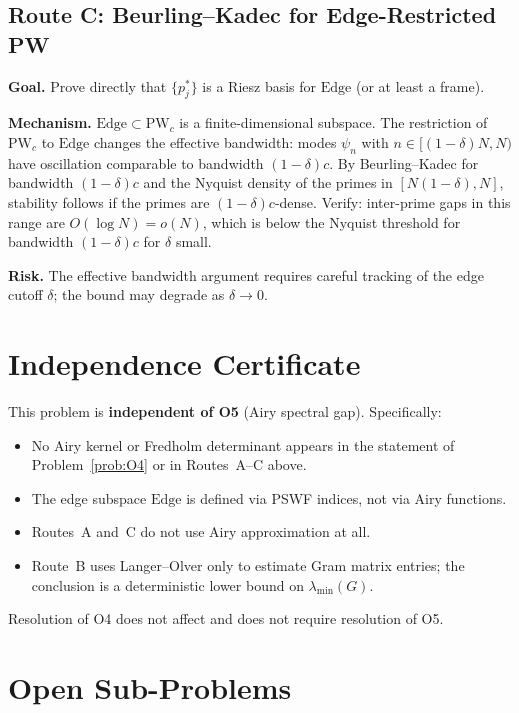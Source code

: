 \documentclass[12pt,a4paper]{amsart}
\theoremstyle{definition}
\newcommand{\Edge}{\mathrm{Edge}}
\newcommand{\PW}{\mathrm{PW}_c}
\begin{document}
\subsection{Route C: Beurling--Kadec for Edge-Restricted PW}

\textbf{Goal.} Prove directly that $\{p_j^*\}$ is a
Riesz basis for $\Edge$ (or at least a frame).

\textbf{Mechanism.}
$\Edge \subset \PW$ is a finite-dimensional subspace.
The restriction of $\PW$ to $\Edge$ changes the
effective bandwidth: modes $\psi_n$ with $n \in [(1-\delta)N,N)$
have oscillation comparable to bandwidth $(1-\delta)c$.
By Beurling--Kadec for bandwidth $(1-\delta)c$
and the Nyquist density of the primes in $[N(1-\delta), N]$,
stability follows if the primes are $(1-\delta)c$-dense.
Verify: inter-prime gaps in this range are $O(\log N) = o(N)$,
which is below the Nyquist threshold for bandwidth
$(1-\delta)c$ for $\delta$ small.

\textbf{Risk.} The effective bandwidth argument requires
careful tracking of the edge cutoff $\delta$;
the bound may degrade as $\delta \to 0$.

\section{Independence Certificate}
\label{sec:independence}

This problem is \textbf{independent of O5} (Airy spectral gap).
Specifically:
\begin{itemize}
  \item No Airy kernel or Fredholm determinant appears
    in the statement of Problem~\ref{prob:O4} or in
    Routes~A--C above.
  \item The edge subspace $\Edge$ is defined via PSWF indices,
    not via Airy functions.
  \item Routes~A and~C do not use Airy approximation at all.
  \item Route~B uses Langer--Olver only to estimate
    Gram matrix entries; the conclusion is a deterministic
    lower bound on $\lambda_{\min}(G)$.
\end{itemize}

Resolution of O4 does not affect and does not require
resolution of O5.

\section{Open Sub-Problems}
\label{sec:subproblems}
\end{document}

